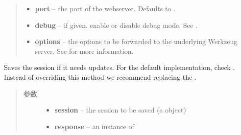 \documentclass[a4paper,12pt]{sphinxmanual}
\begin{document}
\begin{fulllineitems}
\begin{fulllineitems}
\begin{quote}
\begin{description}
\begin{itemize}
\item {} 
\textbf{port} -- the port of the webserver. Defaults to .

\item {} 
\textbf{debug} -- if given, enable or disable debug mode.
See {\hyperref[api:flask.Flask.debug]{}}.

\item {} 
\textbf{options} -- the options to be forwarded to the underlying
Werkzeug server.  See
\href{http://werkzeug.pocoo.org/docs/serving/\#werkzeug.serving.run\_simple}{} for more
information.

\end{itemize}

\end{description}\end{quote}

\end{fulllineitems}


\begin{fulllineitems}
\label{api:flask.Flask.save_session}
Saves the session if it needs updates.  For the default
implementation, check {\hyperref[api:flask.Flask.open_session]{}}.  Instead of overriding this
method we recommend replacing the {\hyperref[api:flask.Flask.session_interface]{}}.
\begin{quote}\begin{description}
\item[{参数}] \leavevmode\begin{itemize}
\item {} 
\textbf{session} -- the session to be saved (a
\href{http://werkzeug.pocoo.org/docs/contrib/securecookie/\#werkzeug.contrib.securecookie.SecureCookie}{}
object)

\item {} 
\textbf{response} -- an instance of {\hyperref[api:flask.Flask.response_class]{}}

\end{itemize}

\end{description}\end{quote}

\end{fulllineitems}


\end{fulllineitems}
\end{document}
